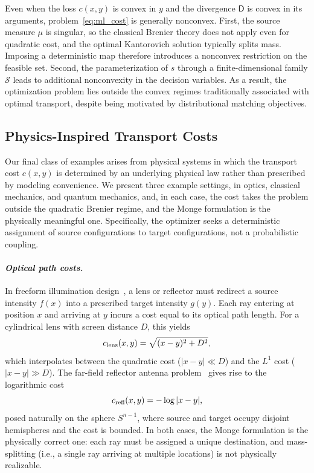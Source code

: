 \documentclass[12pt,leqno]{amsart}
\begin{document}
Even when the loss $c(x,y)$ is convex in $y$ and the divergence $\mathsf D$ is convex in its arguments, problem~\eqref{eq:ml_cost} is generally nonconvex. First, the source measure $\mu$ is singular, so the classical Brenier theory does not apply even for quadratic cost, and the optimal Kantorovich solution typically splits mass. Imposing a deterministic map therefore introduces a nonconvex restriction on the feasible set. Second, the parameterization of $s$ through a finite-dimensional family $\mathcal{S}$ leads to additional nonconvexity in the decision variables. As a result, the optimization problem lies outside the convex regimes traditionally associated with optimal transport, despite being motivated by distributional matching objectives.



\subsection{Physics-Inspired Transport Costs}
\label{sec:physics_monge_example}

Our final class of examples arises from physical systems in which the transport cost $c(x,y)$ is determined by an underlying physical law rather than prescribed by modeling convenience. We present three example settings, in optics, classical mechanics, and quantum mechanics, and, in each case, the cost takes the problem outside the quadratic Brenier regime, and the Monge formulation is the physically meaningful one. Specifically, the optimizer seeks a deterministic assignment of source configurations to target configurations, not a probabilistic coupling.

\paragraph{\it Optical path costs.}
In freeform illumination design~\citep{yadav2019monge,romijn2019freeform,prins2015least}, a lens or reflector must redirect a source intensity $f(x)$ into a prescribed target intensity $g(y)$. Each ray entering at position $x$ and arriving at $y$ incurs a cost equal to its optical path length. For a cylindrical lens with screen distance $D$, this yields
\begin{equation}\label{eq:lens-cost-sec2}
    c_{\textup{lens}}(x,y) = \sqrt{(x-y)^2 + D^2},
\end{equation}
which interpolates between the quadratic cost ($|x-y| \ll D$) and the $L^1$ cost ($|x-y| \gg D$). The far-field reflector antenna problem~\citep{wang2004design,glimm2003optical} gives rise to the logarithmic cost
\begin{equation}\label{eq:reflector-cost-sec2}
    c_{\textup{refl}}(x,y) = -\log|x - y|,
\end{equation}
posed naturally on the sphere $S^{n-1}$, where source and target occupy disjoint hemispheres and the cost is bounded. In both cases, the Monge formulation is the physically correct one: each ray must be assigned a unique destination, and mass-splitting (i.e., a single ray arriving at multiple locations) is not physically realizable.
\end{document}
